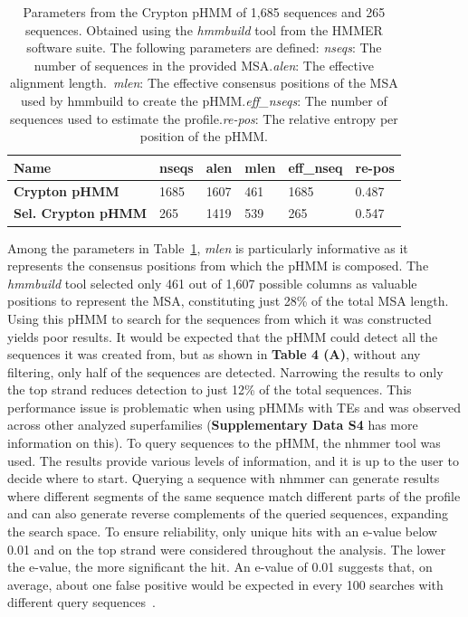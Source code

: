 \documentclass[unnumsec,webpdf,contemporary,large]{oup-authoring-template}%
\theoremstyle{thmstyleone}%
\theoremstyle{thmstyletwo}%
\theoremstyle{thmstylethree}%
\begin{document}
\begin{table}[!t]
\caption{Parameters from the Crypton pHMM of 1,685 sequences and 265 sequences.
Obtained using the \textit{hmmbuild} tool from the HMMER software suite. The
following parameters are defined: \textit{nseqs}: The number of sequences in the
provided MSA.\@ \textit{alen}: The effective alignment length.\ \textit{mlen}:
The effective consensus positions of the MSA used by hmmbuild to create the
pHMM.\@ \textit{eff\_nseqs}: The number of sequences used to estimate the
profile.\@ \textit{re-pos}: The relative entropy per position of the
pHMM.}\label{table:tab3}
\begin{tabularx}{\columnwidth}{@{} X l l l l l @{}}
\toprule
\textbf{Name} & \textbf{nseqs} & \textbf{alen} & \textbf{mlen} &
\textbf{eff\_nseq} & \textbf{re-pos}\\
\midrule
\textbf{Crypton pHMM} & 1685 & 1607 & 461 & 1685 & 0.487 \\
\textbf{Sel. Crypton pHMM} & 265 & 1419 & 539 & 265 & 0.547 \\
\bottomrule
\end{tabularx}
\end{table}
\raggedbottom{}

Among the parameters in Table~\ref{table:tab3}, \textit{mlen} is particularly
informative as it represents the consensus positions from which the pHMM is
composed. The \textit{hmmbuild} tool selected only 461 out of 1,607 possible
columns as valuable positions to represent the MSA, constituting just 28\% of
the total MSA length. Using this pHMM to search for the sequences from which it
was constructed yields poor results. It would be expected that the pHMM could
detect all the sequences it was created from, but as shown in \textbf{Table 4
(A)}, without any filtering, only half of the sequences are detected. Narrowing
the results to only the top strand reduces detection to just 12\% of the total
sequences. This performance issue is problematic when using pHMMs with TEs and
was observed across other analyzed superfamilies (\textbf{Supplementary Data S4}
has more information on this). To query sequences to the pHMM, the nhmmer tool
was used. The results provide various levels of information, and it is up to the
user to decide where to start. Querying a sequence with nhmmer can generate
results where different segments of the same sequence match different parts of
the profile and can also generate reverse complements of the queried sequences,
expanding the search space. To ensure reliability, only unique hits with an
e-value below 0.01 and on the top strand were considered throughout the
analysis. The lower the e-value, the more significant the hit. An e-value of
0.01 suggests that, on average, about one false positive would be expected in
every 100 searches with different query sequences~\cite{sean_r_eddy_hmmer_2023}. 
\end{document}
